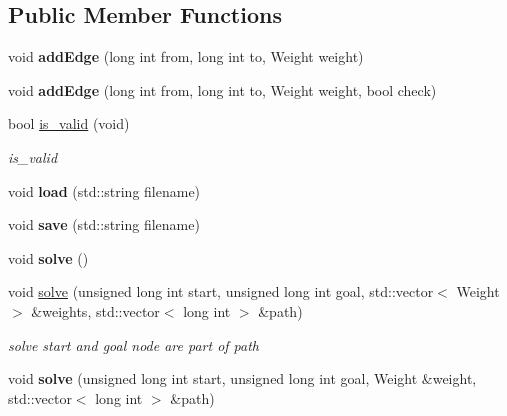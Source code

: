 \subsection*{Public Member Functions}
\begin{DoxyCompactItemize}
\item 
void {\bfseries add\+Edge} (long int from, long int to, Weight weight)\hypertarget{classimr_1_1dijkstra_1_1CDijkstraLite_adf385abaf7d64dc9ed6fb809f6b3a4df}{}\label{classimr_1_1dijkstra_1_1CDijkstraLite_adf385abaf7d64dc9ed6fb809f6b3a4df}

\item 
void {\bfseries add\+Edge} (long int from, long int to, Weight weight, bool check)\hypertarget{classimr_1_1dijkstra_1_1CDijkstraLite_ad5d0e78c9c28f00be6bb463b1bb421a9}{}\label{classimr_1_1dijkstra_1_1CDijkstraLite_ad5d0e78c9c28f00be6bb463b1bb421a9}

\item 
bool \hyperlink{classimr_1_1dijkstra_1_1CDijkstraLite_a355801f9010414276175a1940210faf9}{is\+\_\+valid} (void)
\begin{DoxyCompactList}\small\item\em is\+\_\+valid \end{DoxyCompactList}\item 
void {\bfseries load} (std\+::string filename)\hypertarget{classimr_1_1dijkstra_1_1CDijkstraLite_ab2510df598fc0d4c8804162e3efdeab6}{}\label{classimr_1_1dijkstra_1_1CDijkstraLite_ab2510df598fc0d4c8804162e3efdeab6}

\item 
void {\bfseries save} (std\+::string filename)\hypertarget{classimr_1_1dijkstra_1_1CDijkstraLite_a77ed872599a4871cf290b39fb624d557}{}\label{classimr_1_1dijkstra_1_1CDijkstraLite_a77ed872599a4871cf290b39fb624d557}

\item 
void {\bfseries solve} ()\hypertarget{classimr_1_1dijkstra_1_1CDijkstraLite_ab1a467e67f2ac7d32d5e633e9073385e}{}\label{classimr_1_1dijkstra_1_1CDijkstraLite_ab1a467e67f2ac7d32d5e633e9073385e}

\item 
void \hyperlink{classimr_1_1dijkstra_1_1CDijkstraLite_ab37aecd07de50fc5bcf1974f8f30112a}{solve} (unsigned long int start, unsigned long int goal, std\+::vector$<$ Weight $>$ \&weights, std\+::vector$<$ long int $>$ \&path)
\begin{DoxyCompactList}\small\item\em solve start and goal node are part of path \end{DoxyCompactList}\item 
void {\bfseries solve} (unsigned long int start, unsigned long int goal, Weight \&weight, std\+::vector$<$ long int $>$ \&path)\hypertarget{classimr_1_1dijkstra_1_1CDijkstraLite_a992839f0bbb193cb57c68e96fc90c151}{}\label{classimr_1_1dijkstra_1_1CDijkstraLite_a992839f0bbb193cb57c68e96fc90c151}


\end{DoxyCompactItemize}
